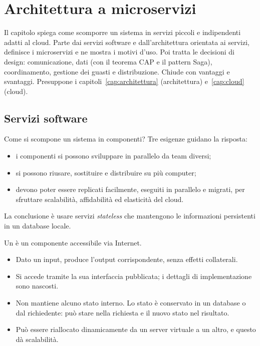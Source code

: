 \chapter{Architettura a microservizi}
\label{cap:microservizi}

\begin{inbreve}
Il capitolo spiega come scomporre un sistema in servizi piccoli e indipendenti adatti al cloud. Parte dai servizi software
e dall'architettura orientata ai servizi, definisce i microservizi e ne mostra i motivi d'uso. Poi tratta le decisioni
di design: comunicazione, dati (con il teorema CAP e il pattern Saga), coordinamento, gestione dei guasti e
distribuzione. Chiude con vantaggi e svantaggi. Presuppone i capitoli~\ref{cap:architettura} (architettura)
e~\ref{cap:cloud} (cloud).
\end{inbreve}

\section{Servizi software}
\label{sec:micro-servizi}

Come si scompone un sistema in componenti? Tre esigenze guidano la risposta:
\begin{itemize}
  \item i componenti si possono sviluppare in parallelo da team diversi;
  \item si possono riusare, sostituire e distribuire su più computer;
  \item devono poter essere replicati facilmente, eseguiti in parallelo e migrati, per sfruttare scalabilità,
    affidabilità ed elasticità del cloud.
\end{itemize}
La conclusione è usare servizi \emph{stateless} che mantengono le informazioni persistenti in un database locale.

\begin{definizione}
Un  è un componente accessibile via Internet.
\begin{itemize}
  \item Dato un input, produce l'output corrispondente, senza effetti collaterali.
  \item Si accede tramite la sua interfaccia pubblicata; i dettagli di implementazione sono nascosti.
  \item Non mantiene alcuno stato interno. Lo stato è conservato in un database o dal richiedente: può stare nella
    richiesta e il nuovo stato nel risultato.
  \item Può essere riallocato dinamicamente da un server virtuale a un altro, e questo dà scalabilità.
\end{itemize}
\end{definizione}

